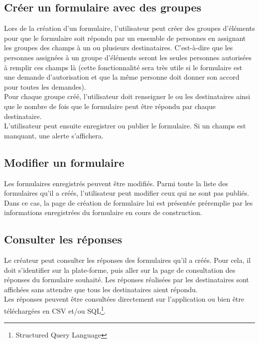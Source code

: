 \documentclass{sigplanconf}
\begin{document}
\subsection{Créer un formulaire avec des groupes}
Lors de la création d'un formulaire, l'utilisateur peut créer des groupes d'éléments pour que le formulaire soit répondu par un ensemble de personnes en assignant les groupes des champs à un ou plusieurs destinataires. C’est-à-dire que les personnes assignées à un groupe d’éléments seront les seules personnes autorisées à remplir ces champs là (cette fonctionnalité sera très utile si le formulaire est une demande d’autorisation et que la même personne doit donner son accord pour toutes les demandes).\\
Pour chaque groupe créé, l'utilisateur doit renseigner le ou les destinataires ainsi que le nombre de fois que le formulaire peut être répondu par chaque destinataire.\\
L'utilisateur peut ensuite enregistrer ou publier le formulaire. Si un champs est manquant, une alerte s'affichera.

\subsection{Modifier un formulaire}
Les formulaires enregistrés peuvent être modifiés. Parmi toute la liste des formulaires qu’il a créés, l’utilisateur peut modifier ceux qui ne sont pas publiés. Dans ce cas, la page de création de formulaire lui est présentée préremplie par les informations enregistrées du formulaire en cours de construction. 

\subsection{Consulter les réponses}
Le créateur peut consulter les réponses des formulaires qu’il a créés. Pour cela, il doit s’identifier sur la plate-forme, puis aller sur la page de consultation des réponses du formulaire souhaité. Les réponses réalisées par les destinataires sont affichées sans attendre que tous les destinataires aient répondu.\\
Les réponses peuvent être consultées directement sur l’application ou bien être téléchargées en CSV et/ou SQL\footnote{Structured Query Language}.
\end{document}
